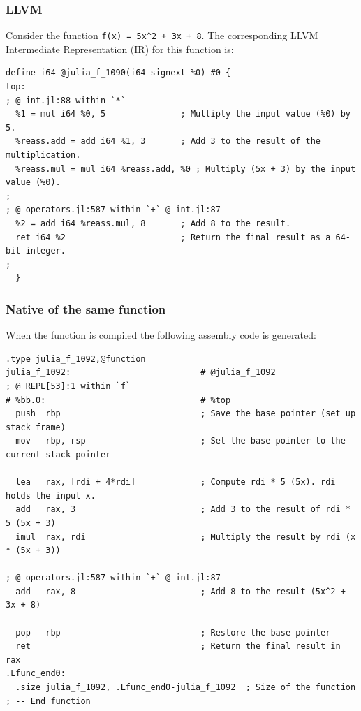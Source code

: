 \documentclass[aspectratio=169]{beamer} %
\begin{document}
\begin{frame}[fragile]
  \frametitle{LLVM}

  Consider the function \verb|f(x) = 5x^2 + 3x + 8|. The corresponding LLVM Intermediate Representation (IR) for this function is:
  \scriptsize
  \begin{verbatim}
define i64 @julia_f_1090(i64 signext %0) #0 {
top:
; @ int.jl:88 within `*`
  %1 = mul i64 %0, 5               ; Multiply the input value (%0) by 5. 
  %reass.add = add i64 %1, 3       ; Add 3 to the result of the multiplication.
  %reass.mul = mul i64 %reass.add, %0 ; Multiply (5x + 3) by the input value (%0).
; 
; @ operators.jl:587 within `+` @ int.jl:87
  %2 = add i64 %reass.mul, 8       ; Add 8 to the result.  
  ret i64 %2                       ; Return the final result as a 64-bit integer.
; 
  }
  \end{verbatim}
\normalsize
\end{frame}

\begin{frame}[fragile]
  \frametitle{Native of the same function}
  When the function is compiled the following assembly code is generated:

  \scriptsize
  \begin{verbatim}
.type julia_f_1092,@function
julia_f_1092:                          # @julia_f_1092
; @ REPL[53]:1 within `f`
# %bb.0:                               # %top
  push  rbp                            ; Save the base pointer (set up stack frame)
  mov   rbp, rsp                       ; Set the base pointer to the current stack pointer

  lea   rax, [rdi + 4*rdi]             ; Compute rdi * 5 (5x). rdi holds the input x.
  add   rax, 3                         ; Add 3 to the result of rdi * 5 (5x + 3)
  imul  rax, rdi                       ; Multiply the result by rdi (x * (5x + 3))

; @ operators.jl:587 within `+` @ int.jl:87
  add   rax, 8                         ; Add 8 to the result (5x^2 + 3x + 8)

  pop   rbp                            ; Restore the base pointer 
  ret                                  ; Return the final result in rax
.Lfunc_end0:
  .size julia_f_1092, .Lfunc_end0-julia_f_1092  ; Size of the function
; -- End function
  \end{verbatim}
  \normalsize

\end{frame}
\end{document}
